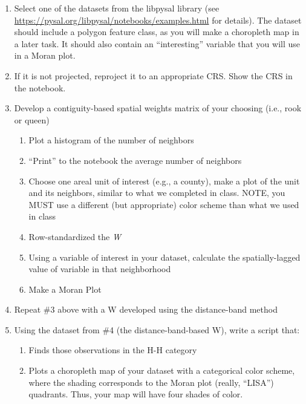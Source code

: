 \documentclass[]{article}
\providecommand{\tightlist}{%
  \setlength{\itemsep}{0pt}\setlength{\parskip}{0pt}}
\begin{document}
\begin{enumerate}
\def\labelenumi{\arabic{enumi}.}
\item
  Select one of the datasets from the libpysal library (see
  \url{https://pysal.org/libpysal/notebooks/examples.html} for details).
  The dataset should include a polygon feature class, as you will make a
  choropleth map in a later task. It should also contain an
  ``interesting'' variable that you will use in a Moran plot.
\item
  If it is not projected, reproject it to an appropriate CRS. Show the
  CRS in the notebook.
\item
  Develop a contiguity-based spatial weights matrix of your choosing
  (i.e., rook or queen)

  \begin{enumerate}
  \def\labelenumii{\arabic{enumii}.}
  \tightlist
  \item
    Plot a histogram of the number of neighbors
  \item
    ``Print'' to the notebook the average number of neighbors
  \item
    Choose one areal unit of interest (e.g., a county), make a plot of
    the unit and its neighbors, similar to what we completed in class.
    NOTE, you MUST use a different (but appropriate) color scheme than
    what we used in class
  \item
    Row-standardized the \emph{W}
  \item
    Using a variable of interest in your dataset, calculate the
    spatially-lagged value of variable in that neighborhood
  \item
    Make a Moran Plot
  \end{enumerate}
\item
  Repeat \#3 above with a W developed using the distance-band method
\item
  Using the dataset from \#4 (the distance-band-based W), write a script
  that:

  \begin{enumerate}
  \def\labelenumii{\arabic{enumii}.}
  \tightlist
  \item
    Finds those observations in the H-H category
  \item
    Plots a choropleth map of your dataset with a categorical color
    scheme, where the shading corresponds to the Moran plot (really,
    ``LISA'') quadrants. Thus, your map will have four shades of color.
  \end{enumerate}
\end{enumerate}
\end{document}
